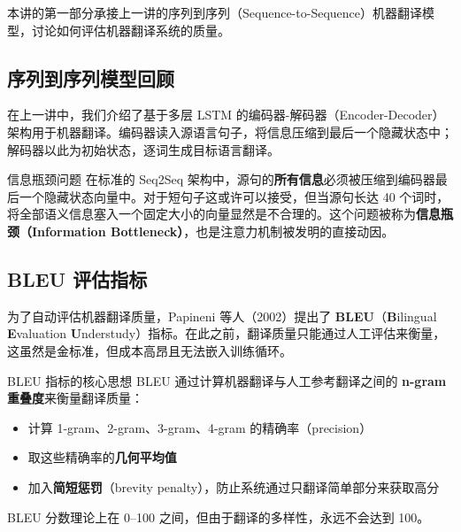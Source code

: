 \documentclass[a4paper]{article}
\begin{document}
本讲的第一部分承接上一讲的序列到序列（Sequence-to-Sequence）机器翻译模型，讨论如何评估机器翻译系统的质量。





\subsection{序列到序列模型回顾}

在上一讲中，我们介绍了基于多层 LSTM 的编码器-解码器（Encoder-Decoder）架构用于机器翻译。编码器读入源语言句子，将信息压缩到最后一个隐藏状态中；解码器以此为初始状态，逐词生成目标语言翻译。




\begin{warningbox}{信息瓶颈问题}
在标准的 Seq2Seq 架构中，源句的\textbf{所有信息}必须被压缩到编码器最后一个隐藏状态向量中。对于短句子这或许可以接受，但当源句长达 40 个词时，将全部语义信息塞入一个固定大小的向量显然是不合理的。这个问题被称为\textbf{信息瓶颈（Information Bottleneck）}，也是注意力机制被发明的直接动因。
\end{warningbox}

\subsection{BLEU 评估指标}

为了自动评估机器翻译质量，Papineni 等人（2002）提出了 \textbf{BLEU}（\textbf{B}ilingual \textbf{E}valuation \textbf{U}nderstudy）指标。在此之前，翻译质量只能通过人工评估来衡量，这虽然是金标准，但成本高昂且无法嵌入训练循环。




\begin{importantbox}{BLEU 指标的核心思想}
BLEU 通过计算机器翻译与人工参考翻译之间的 \textbf{n-gram 重叠度}来衡量翻译质量：
\begin{itemize}
    \item 计算 1-gram、2-gram、3-gram、4-gram 的精确率（precision）
    \item 取这些精确率的\textbf{几何平均值}
    \item 加入\textbf{简短惩罚}（brevity penalty），防止系统通过只翻译简单部分来获取高分
\end{itemize}
BLEU 分数理论上在 0--100 之间，但由于翻译的多样性，永远不会达到 100。
\end{importantbox}
\end{document}

